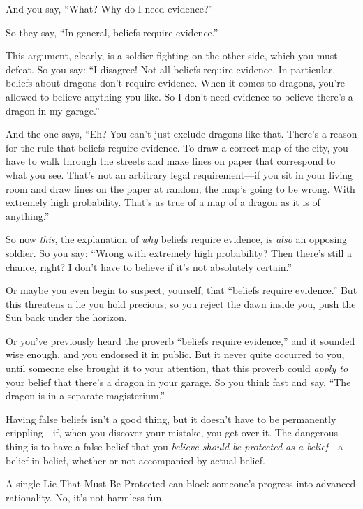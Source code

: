 {
 And you say, ``What? Why do I need
evidence?''}

{
 So they say, ``In general, beliefs require
evidence.''}

{
 This argument, clearly, is a soldier fighting on the other side,
which you must defeat. So you say: ``I disagree! Not
all beliefs require evidence. In particular, beliefs about dragons
don't require evidence. When it comes to dragons,
you're allowed to believe anything you like. So I
don't need evidence to believe there's
a dragon in my garage.''}

{
 And the one says, ``Eh? You can't
just exclude dragons like that. There's a reason for
the rule that beliefs require evidence. To draw a correct map of the
city, you have to walk through the streets and make lines on paper that
correspond to what you see. That's not an arbitrary
legal requirement---if you sit in your living room and draw lines on
the paper at random, the map's going to be wrong. With
extremely high probability. That's as true of a map of
a dragon as it is of anything.''}

{
 So now \textit{this}, the explanation of \textit{why} beliefs
require evidence, is \textit{also} an opposing soldier. So you say:
``Wrong with extremely high probability? Then
there's still a chance, right? I don't
have to believe if it's not absolutely
certain.''}

{
 Or maybe you even begin to suspect, yourself, that
``beliefs require evidence.'' But
this threatens a lie you hold precious; so you reject the dawn inside
you, push the Sun back under the horizon.}

{
 Or you've previously heard the proverb
``beliefs require evidence,'' and it
sounded wise enough, and you endorsed it in public. But it never quite
occurred to you, until someone else brought it to your attention, that
this proverb could \textit{apply to} your belief that
there's a dragon in your garage. So you think fast and
say, ``The dragon is in a separate
magisterium.''}

{
 Having false beliefs isn't a good thing, but it
doesn't have to be permanently crippling---if, when you
discover your mistake, you get over it. The dangerous thing is to have
a false belief that you \textit{believe should be protected as a
belief---}a belief-in-belief, whether or not accompanied by actual
belief.}

{
 A single Lie That Must Be Protected can block
someone's progress into advanced rationality. No,
it's not harmless fun.}

